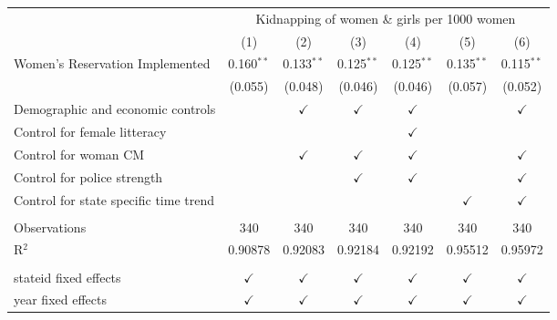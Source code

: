 \begingroup
\centering
\begin{tabular}{lcccccc}
   \toprule
    & \multicolumn{6}{c}{Kidnapping of women \& girls per 1000 women}\\
                                         & (1)           & (2)           & (3)           & (4)           & (5)           & (6)\\  
   \midrule 
   Women's Reservation Implemented       & 0.160$^{**}$  & 0.133$^{**}$  & 0.125$^{**}$  & 0.125$^{**}$  & 0.135$^{**}$  & 0.115$^{**}$\\   
                                         & (0.055)       & (0.048)       & (0.046)       & (0.046)       & (0.057)       & (0.052)\\   
   Demographic and economic controls     &               & $\checkmark$  & $\checkmark$  & $\checkmark$  &               & $\checkmark$\\   
   Control for female litteracy          &               &               &               & $\checkmark$  &               & \\  
   Control for woman CM                  &               & $\checkmark$  & $\checkmark$  & $\checkmark$  &               & $\checkmark$\\   
   Control for police strength           &               &               & $\checkmark$  & $\checkmark$  &               & $\checkmark$\\   
   Control for state specific time trend &               &               &               &               & $\checkmark$  & $\checkmark$\\   
    \\
   Observations                          & 340           & 340           & 340           & 340           & 340           & 340\\  
   R$^2$                                 & 0.90878       & 0.92083       & 0.92184       & 0.92192       & 0.95512       & 0.95972\\  
    \\
   stateid fixed effects                 & $\checkmark$  & $\checkmark$  & $\checkmark$  & $\checkmark$  & $\checkmark$  & $\checkmark$\\   
   year fixed effects                    & $\checkmark$  & $\checkmark$  & $\checkmark$  & $\checkmark$  & $\checkmark$  & $\checkmark$\\   
   \bottomrule
\end{tabular}
\par\endgroup


